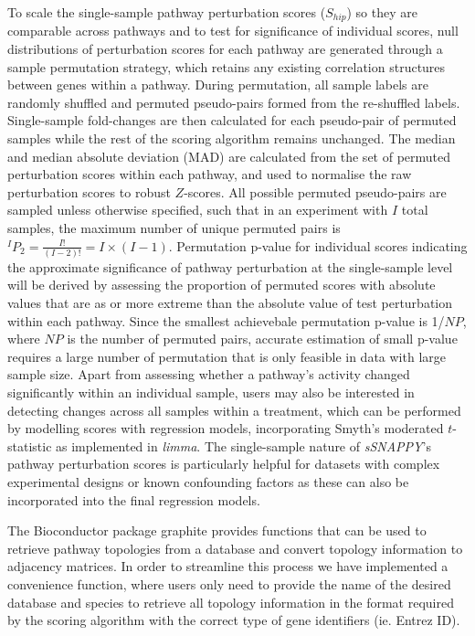\documentclass[9pt,a4paper,]{extarticle}
\begin{document}
To scale the single-sample pathway perturbation scores (\(S_{hip}\)) so they are comparable across pathways and to test for significance of individual scores, null distributions of perturbation scores for each pathway are generated through a sample permutation strategy, which retains any existing correlation structures between genes within a pathway.
During permutation, all sample labels are randomly shuffled and permuted pseudo-pairs formed from the re-shuffled labels.
Single-sample fold-changes are then calculated for each pseudo-pair of permuted samples while the rest of the scoring algorithm remains unchanged.
The median and median absolute deviation (MAD) are calculated from the set of permuted perturbation scores within each pathway, and used to normalise the raw perturbation scores to robust \(Z\)-scores.
All possible permuted pseudo-pairs are sampled unless otherwise specified, such that in an experiment with \(I\) total samples, the maximum number of unique permuted pairs is \({}^IP_2 = \frac{{I!}}{{(I-2)!}} = I \times (I-1)\).
Permutation p-value for individual scores indicating the approximate significance of pathway perturbation at the single-sample level will be derived by assessing the proportion of permuted scores with absolute values that are as or more extreme than the absolute value of test perturbation within each pathway\citep{Theo2009}.
Since the smallest achievebale permutation p-value is 1/\(NP\), where \(NP\) is the number of permuted pairs, accurate estimation of small p-value requires a large number of permutation that is only feasible in data with large sample size.
Apart from assessing whether a pathway's activity changed significantly within an individual sample, users may also be interested in detecting changes across all samples within a treatment, which can be performed by modelling scores with regression models, incorporating Smyth's moderated \(t\)-statistic\citep{Smyth_2004} as implemented in \emph{limma}\citep{limma_2015}.
The single-sample nature of \emph{sSNAPPY}'s pathway perturbation scores is particularly helpful for datasets with complex experimental designs or known confounding factors as these can also be incorporated into the final regression models.

The Bioconductor package graphite\citep{Sales2012} provides functions that can be used to retrieve pathway topologies from a database and convert topology information to adjacency matrices.
In order to streamline this process we have implemented a convenience function, where users only need to provide the name of the desired database and species to retrieve all topology information in the format required by the scoring algorithm with the correct type of gene identifiers (ie. Entrez ID).
\end{document}
